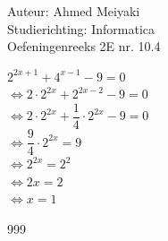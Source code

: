 \documentclass[a4paper]{article}
\begin{document}
  
\noindent \large Auteur: Ahmed Meiyaki \\
\noindent \large Studierichting: Informatica\\
\noindent \large Oefeningenreeks 2E nr. 10.4\\

\medskip

\normalsize

$2^{2x+1} + 4^{x-1} - 9 = 0 $\\

$\Leftrightarrow 2 \cdot 2^{2x} + 2^{2x-2} - 9 = 0 $\\

$\Leftrightarrow 2 \cdot 2^{2x} + \dfrac{1}{4} \cdot 2^{2x} - 9 = 0 $\\

$\Leftrightarrow \dfrac{9}{4} \cdot 2^{2x} = 9 $\\

$\Leftrightarrow 2^{2x} = 2^2 $\\

$\Leftrightarrow 2x = 2 $\\

$\Leftrightarrow x = 1 $\\






\begin{thebibliography}{999}
\end{thebibliography}
\end{document}
